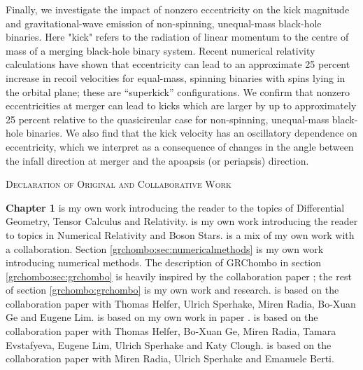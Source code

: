 \documentclass[11pt]{report}  %
\numberwithin{equation}{section}
\begin{document}
Finally, we investigate the impact of nonzero eccentricity on the kick magnitude and gravitational-wave emission of non-spinning, unequal-mass black-hole binaries. Here "kick" refers to the radiation of linear momentum to the centre of mass of a merging black-hole binary system. Recent numerical relativity calculations have shown that eccentricity can lead to an approximate 25 percent increase in recoil velocities for equal-mass, spinning binaries with spins lying in the orbital plane; these are “superkick” configurations. We confirm that nonzero eccentricities at merger can lead to kicks which are larger by up to approximately 25 percent relative to the quasicircular case for non-spinning, unequal-mass black-hole binaries. We also find that the kick velocity has an oscillatory dependence on eccentricity, which we interpret as a consequence of changes in the angle between the infall direction at merger and the apoapsis (or periapsis) direction.


\newpage



  {\centering
  \scshape\LARGE Declaration of Original and Collaborative Work  \par}
  \vspace{1cm}

                         {\bf Chapter 1} is my own work introducing the reader to the topics of Differential Geometry, Tensor Calculus and Relativity.
  \vspace{0.5cm} is my own work introducing the reader to topics in Numerical Relativity and Boson Stars.
  \vspace{0.5cm} is a mix of my own work with a collaboration. Section \ref{grchombo:sec:numericalmethods} is my own work introducing numerical methods. The description of {\sc GRChombo} in section \ref{grchombo:sec:grchombo} is heavily inspired by the collaboration paper \cite{Andrade2021}; the rest of section \ref{grchombo:grchombo} is my own work and research.
  \vspace{0.5cm} is based on the collaboration paper \cite{Helfer:2021brt} with Thomas Helfer, Ulrich Sperhake, Miren Radia, Bo-Xuan Ge and Eugene Lim.
  \vspace{0.5cm} is based on my own work in paper \cite{Croft:2022gks}.
  \vspace{0.5cm} is based on the collaboration paper \cite{croft2022gravitational} with Thomas Helfer, Bo-Xuan Ge, Miren Radia, Tamara Evstafyeva, Eugene Lim, Ulrich Sperhake and Katy Clough.
  \vspace{0.5cm} is based on the collaboration paper \cite{Radia:2021hjs} with Miren Radia, Ulrich Sperhake and Emanuele Berti.
\end{document}
